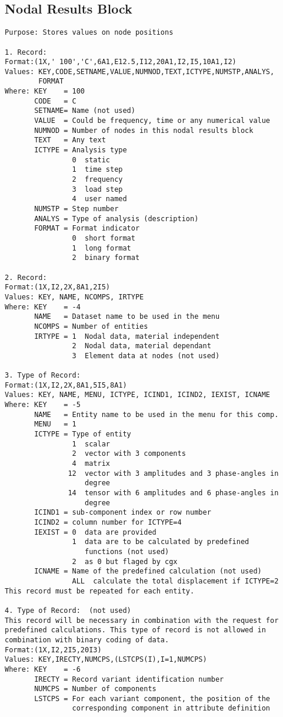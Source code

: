\documentclass{article}
\begin{document}
\subsection{\label{Nodal Results Block}Nodal Results Block}
\begin{verbatim}
Purpose: Stores values on node positions

1. Record:
Format:(1X,' 100','C',6A1,E12.5,I12,20A1,I2,I5,10A1,I2)
Values: KEY,CODE,SETNAME,VALUE,NUMNOD,TEXT,ICTYPE,NUMSTP,ANALYS,
        FORMAT
Where: KEY    = 100
       CODE   = C
       SETNAME= Name (not used)
       VALUE  = Could be frequency, time or any numerical value
       NUMNOD = Number of nodes in this nodal results block
       TEXT   = Any text
       ICTYPE = Analysis type
                0  static
                1  time step
                2  frequency
                3  load step
                4  user named
       NUMSTP = Step number
       ANALYS = Type of analysis (description)
       FORMAT = Format indicator
                0  short format
                1  long format 
                2  binary format 

2. Record:
Format:(1X,I2,2X,8A1,2I5)
Values: KEY, NAME, NCOMPS, IRTYPE
Where: KEY    = -4
       NAME   = Dataset name to be used in the menu
       NCOMPS = Number of entities
       IRTYPE = 1  Nodal data, material independent
                2  Nodal data, material dependant
                3  Element data at nodes (not used) 

3. Type of Record:
Format:(1X,I2,2X,8A1,5I5,8A1) 
Values: KEY, NAME, MENU, ICTYPE, ICIND1, ICIND2, IEXIST, ICNAME
Where: KEY    = -5
       NAME   = Entity name to be used in the menu for this comp.
       MENU   = 1
       ICTYPE = Type of entity
                1  scalar
                2  vector with 3 components
                4  matrix
               12  vector with 3 amplitudes and 3 phase-angles in
                   degree
               14  tensor with 6 amplitudes and 6 phase-angles in
                   degree
       ICIND1 = sub-component index or row number
       ICIND2 = column number for ICTYPE=4
       IEXIST = 0  data are provided
                1  data are to be calculated by predefined
                   functions (not used)
                2  as 0 but flaged by cgx
       ICNAME = Name of the predefined calculation (not used)
                ALL  calculate the total displacement if ICTYPE=2
This record must be repeated for each entity.

4. Type of Record:  (not used)
This record will be necessary in combination with the request for 
predefined calculations. This type of record is not allowed in
combination with binary coding of data.
Format:(1X,I2,2I5,20I3) 
Values: KEY,IRECTY,NUMCPS,(LSTCPS(I),I=1,NUMCPS)
Where: KEY    = -6
       IRECTY = Record variant identification number
       NUMCPS = Number of components
       LSTCPS = For each variant component, the position of the
                corresponding component in attribute definition



\end{verbatim}
\end{document}
